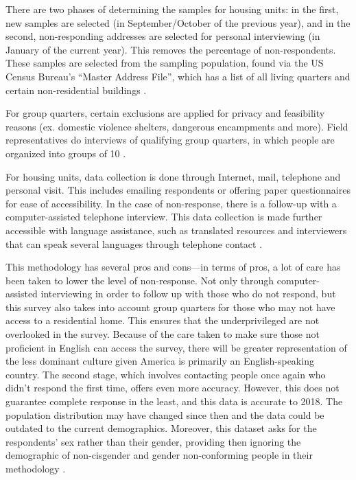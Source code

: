 \documentclass[
]{article}
\begin{document}
There are two phases of determining the samples for housing units: in the first, new samples are selected (in September/October of the previous year), and in the second, non-responding addresses are selected for personal interviewing (in January of the current year). This removes the percentage of non-respondents. These samples are selected from the sampling population, found via the US Census Bureau's ``Master Address File'', which has a list of all living quarters and certain non-residential buildings \citep{citeACS}.

For group quarters, certain exclusions are applied for privacy and feasibility reasons (ex. domestic violence shelters, dangerous encampments and more). Field representatives do interviews of qualifying group quarters, in which people are organized into groups of 10 \citep{citeACS}.

For housing units, data collection is done through Internet, mail, telephone and personal visit. This includes emailing respondents or offering paper questionnaires for ease of accessibility. In the case of non-response, there is a follow-up with a computer-assisted telephone interview. This data collection is made further accessible with language assistance, such as translated resources and interviewers that can speak several languages through telephone contact \citep{citeACS}.

This methodology has several pros and cons---in terms of pros, a lot of care has been taken to lower the level of non-response. Not only through computer-assisted interviewing in order to follow up with those who do not respond, but this survey also takes into account group quarters for those who may not have access to a residential home. This ensures that the underprivileged are not overlooked in the survey. Because of the care taken to make sure those not proficient in English can access the survey, there will be greater representation of the less dominant culture given America is primarily an English-speaking country. The second stage, which involves contacting people once again who didn't respond the first time, offers even more accuracy. However, this does not guarantee complete response in the least, and this data is accurate to 2018. The population distribution may have changed since then and the data could be outdated to the current demographics. Moreover, this dataset asks for the respondents' sex rather than their gender, providing then ignoring the demographic of non-cisgender and gender non-conforming people in their methodology \citep{citeACS}.
\end{document}

